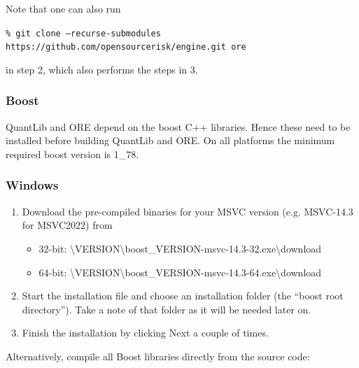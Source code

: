 \documentclass[12pt, a4paper]{article}
\newcommand{\bs}{\textbackslash}
\begin{document}
Note that one can also run 

{\footnotesize \tt\% git clone --recurse-submodules https://github.com/opensourcerisk/engine.git ore}

in step 2, which also performs the steps in 3.

\subsubsection{Boost}\label{sec:boost}

QuantLib and ORE depend on the boost C++ libraries. Hence these need to be installed before building QuantLib and
ORE. On all platforms the minimum required boost version is 1\_78.

\subsubsection*{Windows}

\begin{enumerate}
\item Download the pre-compiled binaries for your MSVC version (e.g. MSVC-14.3 for MSVC2022) from \cite{boost-binaries}
\begin{itemize}
\item 32-bit: \cite{boost-binaries}{\bs}VERSION{\bs}boost\_VERSION-msvc-14.3-32.exe{\bs}download 
\item 64-bit: \cite{boost-binaries}{\bs}VERSION{\bs}boost\_VERSION-msvc-14.3-64.exe{\bs}download
\end{itemize}
\item Start the installation file and choose an installation folder (the ``boost root directory''). Take a note of that folder as it will be needed later on.   
\item Finish the installation by clicking Next a couple of times.
\end{enumerate}
    
Alternatively, compile all Boost libraries directly from the source code:
\end{document}
